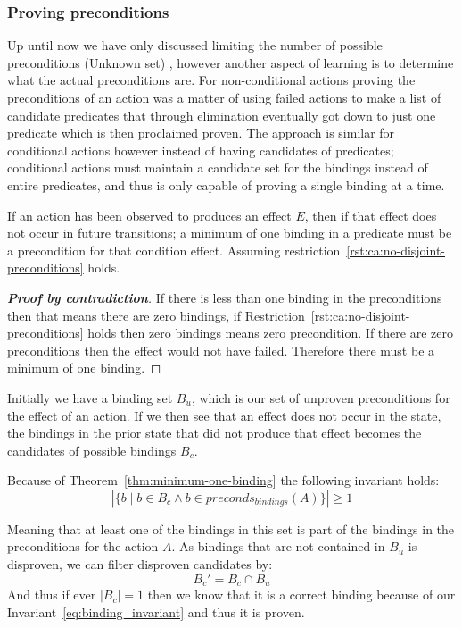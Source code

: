 \documentclass[../Master.tex]{subfiles}
\begin{document}
\subsubsection{Proving preconditions}
Up until now we have only discussed limiting the number of possible preconditions (Unknown set) , however another aspect of learning is to determine what the actual preconditions are.
For non-conditional actions proving the preconditions of an action was a matter of using failed actions to make a list of candidate predicates that through elimination eventually got down to just one predicate which is then proclaimed proven. The approach is similar for conditional actions however instead of having candidates of predicates; conditional actions must maintain a candidate set for the bindings instead of entire predicates, and thus is only capable of proving a single binding at a time.

\begin{theorem}\label{thm:minimum-one-binding}
	If an action has been observed to produces an effect $E$, then if that effect does not occur in future transitions;
	a minimum of one binding in a predicate must be a precondition for that condition effect. Assuming restriction~\ref{rst:ca:no-disjoint-preconditions} holds.

	\begin{proof}[\textbf{Proof by contradiction}] If there is less than one binding in the preconditions then that means there are zero bindings, if Restriction~\ref{rst:ca:no-disjoint-preconditions} holds then zero bindings means zero precondition. If there are zero preconditions then the effect would not have failed. Therefore there must be a minimum of one binding. \qedhere
	\end{proof}
\end{theorem}

Initially we have a binding set $B_u$, which is our set of unproven preconditions for the effect of an action.
If we then see that an effect does not occur in the state, the bindings in the prior state that did not produce that effect becomes the candidates of possible bindings $B_c$.

Because of Theorem~\ref{thm:minimum-one-binding} the following invariant holds:
\begin{equation} \label{eq:binding_invariant}
\left| \{b  \mid  b \in B_c \land b \in preconds_{bindings}(A)\} \right|  \ge 1
\end{equation}


Meaning that at least one of the bindings in this set is part of the bindings in the preconditions for the action $A$. As bindings that are not contained in $B_u$ is disproven, we can filter disproven candidates by:
\begin{equation}
    B_c' = B_c \cap B_u
\end{equation}
And thus if ever $|B_c| = 1$ then we know that it is a correct binding because of our Invariant~\ref{eq:binding_invariant} and thus it is proven.
\end{document}
